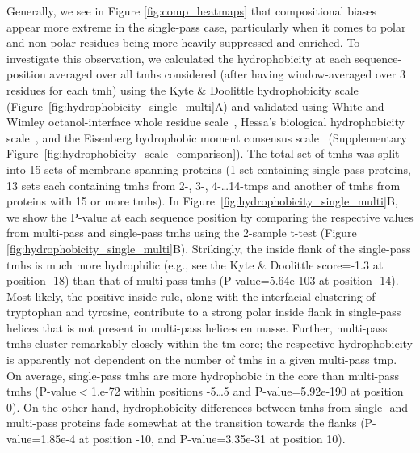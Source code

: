 Generally, we see in Figure \ref{fig:comp_heatmaps} that compositional biases appear more extreme in the single-pass case, particularly when it comes to polar and non-polar residues being more heavily suppressed and enriched. To investigate this observation, we calculated the hydrophobicity at each sequence-position averaged over all \gls{tmh}s considered (after having window-averaged over 3 residues for each \gls{tmh}) using the Kyte \& Doolittle hydrophobicity scale~\cite{Kyte1982} (Figure~\ref{fig:hydrophobicity_single_multi}A) and validated using White and Wimley octanol-interface whole residue scale~\cite{White1999}, Hessa’s biological hydrophobicity scale~\cite{Hessa2005}, and the Eisenberg hydrophobic moment consensus scale~\cite{Eisenberg1984} (Supplementary Figure~\ref{fig:hydrophobicity_scale_comparison}). The total set of \gls{tmh}s was split into 15 sets of membrane-spanning proteins (1 set containing single-pass proteins, 13 sets each containing \gls{tmh}s from 2-, 3-, 4-\ldots 14-\gls{tmp}s and another of \gls{tmh}s from proteins with 15 or more \gls{tmh}s). In Figure~\ref{fig:hydrophobicity_single_multi}B, we show the P-value at each sequence position by comparing the respective values from multi-pass and single-pass \gls{tmh}s using the 2-sample t-test (Figure \ref{fig:hydrophobicity_single_multi}B). Strikingly, the inside flank of the single-pass \gls{tmh}s is much more hydrophilic (e.g., see the Kyte \& Doolittle score=-1.3 at position -18) than that of multi-pass \gls{tmh}s (P-value=5.64e-103 at position -14). Most likely, the positive inside rule, along with the interfacial clustering of tryptophan and tyrosine, contribute to a strong polar inside flank in single-pass helices that is not present in multi-pass helices en masse. Further, multi-pass \gls{tmh}s cluster remarkably closely within the \gls{tm} core; the respective hydrophobicity is apparently not dependent on the number of \gls{tmh}s in a given multi-pass \gls{tmp}. On average, single-pass \gls{tmh}s are more hydrophobic in the core than multi-pass \gls{tmh}s (P-value$<$1.e-72 within positions -5…5 and P-value=5.92e-190 at position 0). On the other hand, hydrophobicity differences between \gls{tmh}s from single- and multi-pass proteins fade somewhat at the transition towards the flanks (P-value=1.85e-4 at position -10, and P-value=3.35e-31 at position 10).

